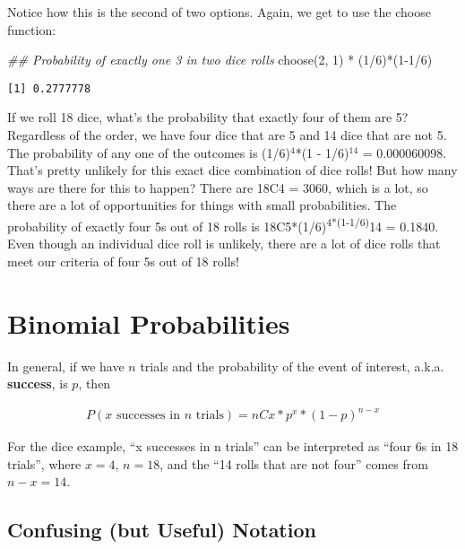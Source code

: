 \documentclass[
  letterpaper,
  DIV=11,
  numbers=noendperiod]{scrreprt}
\newenvironment{Shaded}{\begin{snugshade}}{\end{snugshade}}
\newcommand{\DecValTok}[1]{\textcolor[rgb]{0.68,0.00,0.00}{#1}}
\newcommand{\DocumentationTok}[1]{\textcolor[rgb]{0.37,0.37,0.37}{\textit{#1}}}
\newcommand{\FunctionTok}[1]{\textcolor[rgb]{0.28,0.35,0.67}{#1}}
\newcommand{\NormalTok}[1]{\textcolor[rgb]{0.00,0.23,0.31}{#1}}
\newcommand{\SpecialCharTok}[1]{\textcolor[rgb]{0.37,0.37,0.37}{#1}}
\begin{document}
Notice how this is the second of two options. Again, we get to use the
choose function:

\begin{Shaded}
\begin{Highlighting}[]
\DocumentationTok{\#\# Probability of exactly one 3 in two dice rolls}
\FunctionTok{choose}\NormalTok{(}\DecValTok{2}\NormalTok{, }\DecValTok{1}\NormalTok{) }\SpecialCharTok{*}\NormalTok{ (}\DecValTok{1}\SpecialCharTok{/}\DecValTok{6}\NormalTok{)}\SpecialCharTok{*}\NormalTok{(}\DecValTok{1{-}1}\SpecialCharTok{/}\DecValTok{6}\NormalTok{)}
\end{Highlighting}
\end{Shaded}

\begin{verbatim}
[1] 0.2777778
\end{verbatim}

If we roll 18 dice, what's the probability that exactly four of them are
5? Regardless of the order, we have four dice that are 5 and 14 dice
that are not 5. The probability of any one of the outcomes is
(1/6)\(^4\)*(1 - 1/6)\(^{14}\) = 0.000060098. That's pretty unlikely for
this exact dice combination of dice rolls! But how many ways are there
for this to happen? There are 18C4 = 3060, which is a lot, so there are
a lot of opportunities for things with small probabilities. The
probability of exactly four 5s out of 18 rolls is
18C5*(1/6)\textsuperscript{4*(1-1/6)}14 = 0.1840. Even though an
individual dice roll is unlikely, there are a lot of dice rolls that
meet our criteria of four 5s out of 18 rolls!

\hypertarget{binomial-probabilities-1}{%
\section{Binomial Probabilities}\label{binomial-probabilities-1}}

In general, if we have \(n\) trials and the probability of the event of
interest, a.k.a. \textbf{success}, is \(p\), then

\begin{align*}
P(x\text{ successes in }n\text{ trials}) = nCx*p^x*(1-p)^{n-x}
\end{align*}

For the dice example, ``x successes in n trials'' can be interpreted as
``four 6s in 18 trials'', where \(x=4\), \(n=18\), and the ``14 rolls
that are not four'' comes from \(n-x=14\).

\hypertarget{confusing-but-useful-notation}{%
\subsection{Confusing (but Useful)
Notation}\label{confusing-but-useful-notation}}
\end{document}
